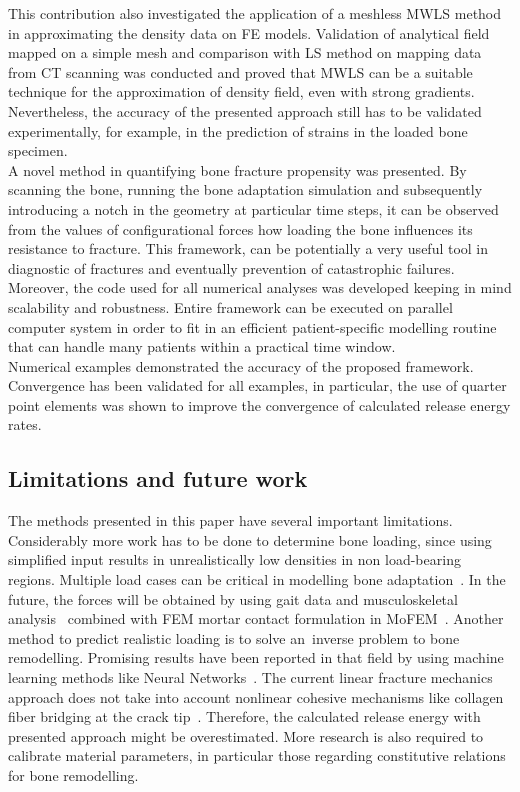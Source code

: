 \documentclass[11pt]{acmeArticle}
\numberwithin{equation}{section}
\begin{document}
This contribution also investigated the application of a meshless MWLS method in approximating the density data on FE models. Validation of analytical field mapped on a simple mesh and comparison with LS method on mapping data from CT scanning was conducted and proved that MWLS can be a suitable technique for the approximation of density field, even with strong gradients. 
Nevertheless, the accuracy of the presented approach still has to be validated experimentally, for example, in the prediction of strains in the loaded bone specimen.  \\

A novel method in quantifying bone fracture propensity was presented. By scanning the bone, running the bone adaptation simulation and subsequently introducing a notch in the geometry at particular time steps, it can be observed from the values of configurational forces how loading the bone influences its resistance to fracture. 
This framework, can be potentially a very useful tool in diagnostic of fractures and eventually prevention of catastrophic failures. 
Moreover, the code used for all numerical analyses was developed keeping in mind scalability and robustness. 
Entire framework can be executed on parallel computer system in order to fit in an efficient patient-specific modelling routine that can handle many patients within a practical time window. \\

Numerical examples demonstrated the accuracy of the proposed framework. 
Convergence has been validated for all examples, in particular, the use of quarter point elements was shown to improve the convergence of calculated release energy rates. 
\subsection{Limitations and future work}
The methods presented in this paper have several important limitations. 
Considerably more work has to be done to determine bone loading, since using simplified input results in unrealistically low densities in non load-bearing regions. 
Multiple load cases can be critical in modelling bone adaptation~\citep{geraldes2016consideration}. 
In the future, the forces will be obtained by using gait data and musculoskeletal analysis~\citep{Delp2007} combined with FEM mortar contact formulation in MoFEM~\citep{athanasiadis2018mortar}. 
Another method to predict realistic loading is to solve an~inverse problem to bone remodelling. 
Promising results have been reported in that field by using machine learning methods like Neural Networks~\citep{campoli2012computational}. 
The current linear fracture mechanics approach does not take into account nonlinear cohesive mechanisms like collagen fiber bridging at the crack tip~\citep{yang2006fracture}. 
Therefore, the calculated release energy with presented approach might be overestimated. 
More research is also required to calibrate material parameters, in particular those regarding constitutive relations for bone remodelling. 
\end{document}
